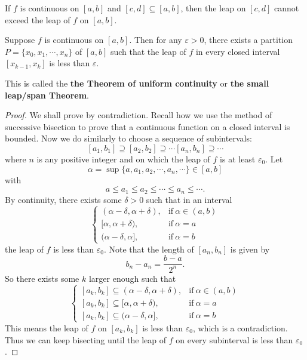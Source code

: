 \documentclass[a4paper]{ctexart}
\begin{document}
	\begin{mypro}
		If $f$ is continuous on $[a,b]$ and $[c,d]\subseteq [a,b]$, then the leap on $[c,d]$ cannot exceed the leap of $f$ on $[a,b]$.
	\end{mypro}
	\begin{mythm}
		Suppose $f$ is continuous on $[a,b]$. Then for any $\varepsilon>0$, there exists a partition $P=\{x_0,x_1,\cdots,x_n\}$ of $[a,b]$ such that the leap of $f$ in every closed interval $[x_{k-1},x_k]$ is less than $\varepsilon$.

		This is called the \textbf{the Theorem of uniform continuity} or \textbf{the small leap/span Theorem}.
	\end{mythm}
	\begin{proof}
		We shall prove by contradiction. Recall how we use the method of successive bisection to prove that a continuous function on a closed interval is bounded. Now we do similarly to choose a sequence of subintervals:
		\[
		[a_1,b_1]\supseteq [a_2,b_2]\supseteq \cdots [a_n,b_n] \supseteq \cdots
		\]
		where $n$ is any positive integer and on which the leap of $f$ is at least $\varepsilon_0$. Let 
		\[
		\alpha = \sup \{a,a_1,a_2,\cdots,a_n,\cdots\} \in [a,b]
		\]
		with
		\[
		a\le a_1 \le a_2 \le \cdots \le a_n \le \cdots.
		\]
		By continuity, there exists some $\delta>0$ such that in an interval
		\[
		\begin{cases}
		(\alpha-\delta, \alpha + \delta), & \text{if}\ \alpha\in (a,b)\\[4pt]
		[\alpha, \alpha + \delta), & \text{if}\ \alpha=a\\[4pt]
		(\alpha - \delta, \alpha], & \text{if}\ \alpha=b
		\end{cases}
		\]
		the leap of $f$ is less than $\varepsilon_0$. Note that the length of $[a_n,b_n]$ is given by
		\[
		b_n - a_n = \frac{b-a}{2^n}.
		\]
		So there exists some $k$ larger enough such that
		\[
		\begin{cases}
			[a_k,b_k] \subseteq (\alpha-\delta, \alpha + \delta), & \text{if}\ \alpha\in (a,b)\\[4pt]
			[a_k,b_k] \subseteq [\alpha, \alpha + \delta), & \text{if}\ \alpha=a\\[4pt]
			[a_k,b_k] \subseteq (\alpha - \delta, \alpha], & \text{if}\ \alpha=b
		\end{cases}
		\]
		This means the leap of $f$ on $[a_k,b_k]$ is less than $\varepsilon_0$, which is a contradiction. Thus we can keep bisecting until the leap of $f$ on every subinterval is less than $\varepsilon_0$.
	\end{proof}
\end{document}

